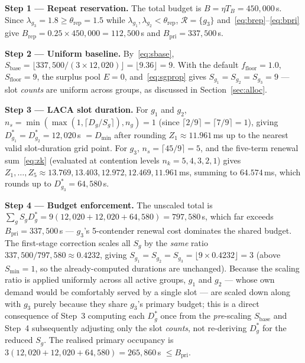\documentclass[journal]{IEEEtran}
\begin{document}
\textbf{Step 1 --- Repeat reservation.}
The total budget is $B\!=\!\eta T_B\!=\!450{,}000$\,\textmu{}s.
Since $\lambda_{g_3}\!=\!1.8\!\geq\!\theta_\mathrm{rep}\!=\!1.5$ while
$\lambda_{g_1},\lambda_{g_2}\!<\!\theta_\mathrm{rep}$,
$\mathcal{R}\!=\!\{g_3\}$ and~\eqref{eq:brep}--\eqref{eq:bpri} give
$B_\mathrm{rep}\!=\!0.25\!\times\!450{,}000\!=\!112{,}500$\,\textmu{}s
and $B_\mathrm{pri}\!=\!337{,}500$\,\textmu{}s.

\textbf{Step 2 --- Uniform baseline.}
By~\eqref{eq:sbase}, $S_\mathrm{base}\!=\!\lfloor 337{,}500 /
(3\!\times\!12{,}020)\rfloor\!=\!\lfloor 9.36\rfloor\!=\!9$.
With the default $f_\mathrm{floor}\!=\!1.0$, $S_\mathrm{floor}\!=\!9$,
the surplus pool $E\!=\!0$, and~\eqref{eq:sgprop} gives
$S_{g_1}\!=\!S_{g_2}\!=\!S_{g_3}\!=\!9$ --- slot \emph{counts} are
uniform across groups, as discussed in Section~\ref{sec:alloc}.

\textbf{Step 3 --- LACA slot duration.}
For $g_1$ and $g_2$, $n_s\!=\!\min(\max(1,\lceil D_g/S_g\rceil),n_g)\!=\!1$
(since $\lceil 2/9\rceil\!=\!\lceil 7/9\rceil\!=\!1$), giving
$D_{g_1}^{*}\!=\!D_{g_2}^{*}\!=\!12{,}020$\,\textmu{}s
$\!=\!D_\mathrm{min}$ after rounding $Z_1\!\approx\!11.961$\,ms up to
the nearest valid slot-duration grid point.
For $g_3$, $n_s\!=\!\lceil 45/9\rceil\!=\!5$, and the five-term renewal
sum~\eqref{eq:zk} (evaluated at contention levels $n_k\!=\!5,4,3,2,1$)
gives $Z_1,\ldots,Z_5\!\approx\!13.769, 13.403, 12.972, 12.469,
11.961$\,ms, summing to $64.574$\,ms, which rounds up to
$D_{g_3}^{*}\!=\!64{,}580$\,\textmu{}s.

\textbf{Step 4 --- Budget enforcement.}
The unscaled total is $\sum_g S_g D_g^{*}\!=\!9(12{,}020\!+\!12{,}020\!+
\!64{,}580)\!=\!797{,}580$\,\textmu{}s, which far exceeds
$B_\mathrm{pri}\!=\!337{,}500$\,\textmu{}s --- $g_3$'s 5-contender
renewal cost dominates the shared budget.
The first-stage correction scales all $S_g$ by the \emph{same} ratio
$337{,}500/797{,}580\!\approx\!0.4232$, giving
$S_{g_1}\!=\!S_{g_2}\!=\!S_{g_3}\!=\!\lfloor 9\!\times\!0.4232\rfloor\!=
\!3$ (above $S_\mathrm{min}\!=\!1$, so the already-computed durations
are unchanged).
Because the scaling ratio is applied uniformly across all active
groups, $g_1$ and $g_2$ --- whose own demand would be comfortably
served by a single slot --- are scaled down along with $g_3$ purely
because they share $g_3$'s primary budget; this is a direct
consequence of Step~3 computing each $D_g^{*}$ once from the
\emph{pre}-scaling $S_\mathrm{base}$ and Step~4 subsequently adjusting
only the slot \emph{counts}, not re-deriving $D_g^{*}$ for the reduced
$S_g$.
The realised primary occupancy is
$3(12{,}020\!+\!12{,}020\!+\!64{,}580)\!=\!265{,}860$\,\textmu{}s
$\!\leq\!B_\mathrm{pri}$.
\end{document}
